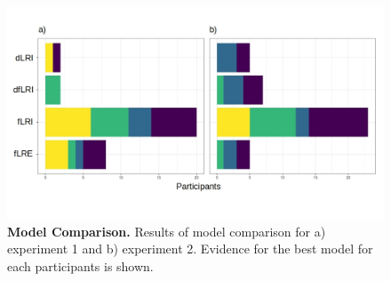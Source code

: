 \documentclass[a4paper,12pt]{article}
\begin{document}
\begin{figure}[ht!]
\centerline
{\includegraphics[width=1\textwidth]{figures/ModelComparisonAll.jpg}}
\caption{\textbf{Model Comparison.} Results of model comparison for a) experiment 1 and b) experiment 2. Evidence for the best model for each participants is shown.}
\label{fig:ModelComparison}
\end{figure}

\begin{table} 
    \centering 
    \caption{\label{tab:ModelComp}Model Comparison. BIC values and standard errors for each model for Experiment 1 and experiment 2. \textit{Best(N)} and \textit{Very strong(N)} refer to the number of participants for which the model was the best fit and for which there was very strong evidence, respectively   }
    \end{table}
\end{document}
